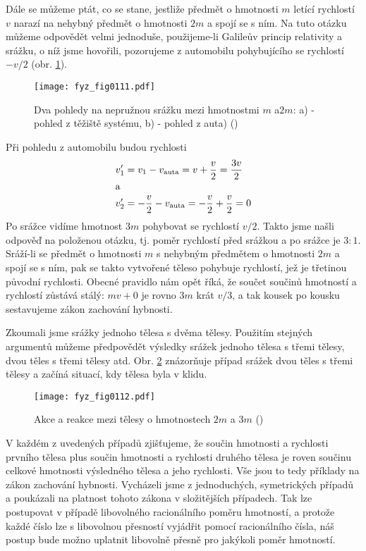     Dále se můžeme ptát, co se stane, jestliže předmět o hmotnosti \(m\) letící rychlostí \(v\) 
    narazí na nehybný předmět o hmotnosti \(2m\) a spojí se s ním. Na tuto otázku můžeme odpovědět 
    velmi jednoduše, použijeme-li Galileův princip relativity a srážku, o níž jsme hovořili, 
    pozorujeme z automobilu pohybujícího se rychlostí \(-v/2\) (obr. \ref{fyz:fig0111}).

    \begin{figure}[ht!]  %
      \centering
      \texttt{[image: fyz\_fig0111.pdf]}
      \caption{Dva pohledy na nepružnou srážku mezi hmotnostmi \(m\) a\(2m\): a) - pohled z těžiště 
              systému, b) - pohled z auta)
              (\cite[s.~146]{Feynman01})}
      \label{fyz:fig0111}
    \end{figure}
    Při pohledu z automobilu budou rychlosti
    \begin{align*}
      v_1' &= v_1 - v_{\text{auta}} = v + \frac{v}{2} = \frac{3v}{2}   \\
      \shortintertext{a}
      v_2' &= -\frac{v}{2} - v_{\text{auta}} = - \frac{v}{2} + \frac{v}{2} = 0
    \end{align*}
    Po srážce vidíme hmotnost \(3m\) pohybovat se rychlostí \(v/2\). Takto jsme našli odpověď na 
    položenou otázku, tj. poměr rychlostí před srážkou a po srážce je \(3:1\). Sráží-li se předmět 
    o hmotnosti \(m\) s nehybným předmětem o hmotnosti \(2m\) a spojí se s ním, pak se takto 
    vytvořené těleso pohybuje rychlostí, jež je třetinou původní rychlosti. Obecné pravidlo nám 
    opět říká, že součet součinů hmotností a rychlostí zůstává stálý: \(mv + 0\) je rovno \(3m\) 
    krát \(v/3\), a tak kousek po kousku sestavujeme zákon zachování hybnosti.
    
    Zkoumali jsme srážky jednoho tělesa s dvěma tělesy. Použitím stejných argumentů můžeme 
    předpovědět výsledky srážek jednoho tělesa s třemi tělesy, dvou těles s třemi tělesy atd. Obr. 
    \ref{fyz:fig0112} znázorňuje případ srážek dvou těles s třemi tělesy a začíná situací, kdy 
    tělesa byla v klidu.
    
    \begin{figure}[ht!]  %
      \centering
      \texttt{[image: fyz\_fig0112.pdf]}
      \caption{Akce a reakce mezi tělesy o hmotnostech \(2m\) a \(3m\)
              (\cite[s.~147]{Feynman01})}
      \label{fyz:fig0112}
    \end{figure}
    V každém z uvedených případů zjišťujeme, že součin hmotnosti a rychlosti prvního tělesa plus 
    součin hmotnosti a rychlosti druhého tělesa je roven součinu celkové hmotnosti výsledného 
    tělesa a jeho rychlosti. Vše jsou to tedy příklady na zákon zachování hybnosti. Vycházeli jsme 
    z jednoduchých, symetrických případů a poukázali na platnost tohoto zákona v složitějších 
    případech. Tak lze postupovat v případě libovolného racionálního poměru hmotností, a protože 
    každé číslo lze s libovolnou přesností vyjádřit pomocí racionálního čísla, náš postup bude 
    možno uplatnit libovolně přesně pro jakýkoli poměr hmotností.
     
